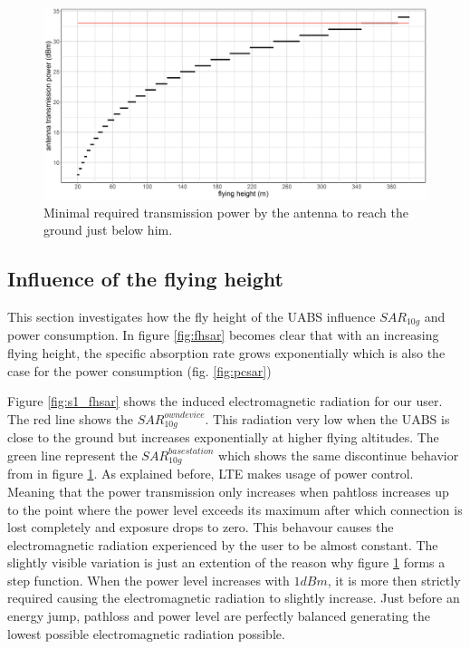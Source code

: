 \begin{figure}[h!]
  \includegraphics[width=\textwidth]{../results/s1/ptx.png}
  \caption{Minimal required transmission power by the antenna to reach the ground just below him.}
  \label{fig:ptxfh}
\end{figure}

\subsection{Influence of the flying height}
\label{sub:senario1_influenceOfFlyHeight}

This section investigates how the fly height of the \gls{UABS} influence $SAR_{10g}$ and power consumption. In figure \ref{fig:fhsar}
becomes clear that with an increasing flying height, the specific absorption rate grows exponentially 
which is also the case for the power consumption (fig. \ref{fig:pcsar})  

Figure \ref{fig:s1_fhsar} shows the induced electromagnetic radiation for our user. The red line shows the $SAR^{own device}_{10g}$. This radiation very low when the \gls{UABS}
is close to the ground but increases exponentially at higher flying altitudes. The green line represent the $SAR^{basestation}_{10g}$ which shows the same discontinue 
behavior from in figure \ref{fig:ptxfh}. As explained before, \gls{LTE} makes usage of power control. Meaning that the power transmission only increases when pahtloss 
increases up to the point where the power level exceeds its maximum after which connection is lost completely and exposure drops to zero. 
This behavour causes the electromagnetic radiation experienced by the user to be almost constant. The slightly visible variation is just an extention of the reason 
why figure \ref{fig:ptxfh} forms a step function. When the power level increases with $1 dBm$, it is more then strictly required causing the electromagnetic radiation to 
slightly increase. Just before an energy jump, pathloss and power level are perfectly balanced generating the lowest possible electromagnetic radiation possible.

